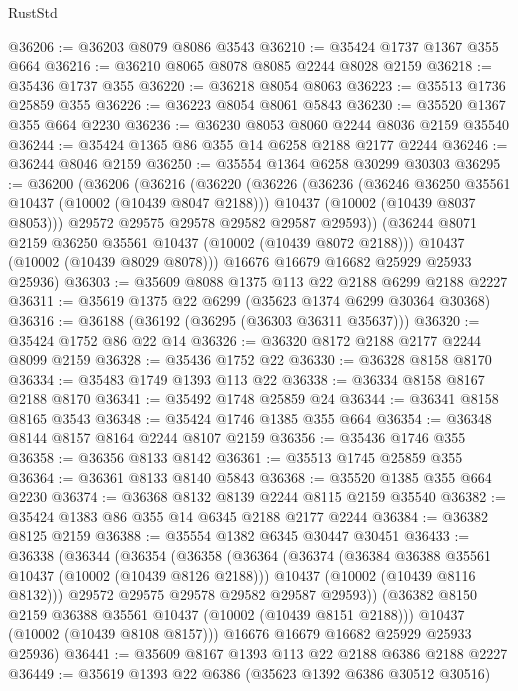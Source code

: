 \begin{lexlean}{RustStd}
\begin{coremodule}
@36206 := @36203 @8079 @8086 @3543
@36210 := @35424 @1737 @1367 @355 @664
@36216 := @36210 @8065 @8078 @8085 @2244 @8028 @2159
@36218 := @35436 @1737 @355
@36220 := @36218 @8054 @8063
@36223 := @35513 @1736 @25859 @355
@36226 := @36223 @8054 @8061 @5843
@36230 := @35520 @1367 @355 @664 @2230
@36236 := @36230 @8053 @8060 @2244 @8036 @2159 @35540
@36244 := @35424 @1365 @86 @355 @14 @6258 @2188 @2177 @2244
@36246 := @36244 @8046 @2159
@36250 := @35554 @1364 @6258 @30299 @30303
@36295 := @36200
    (@36206
      (@36216
        (@36220
          (@36226
            (@36236
              (@36246 @36250 @35561 @10437 (@10002 (@10439 @8047 @2188)))
              @10437
              (@10002 (@10439 @8037 @8053)))
            @29572
            @29575
            @29578
            @29582
            @29587
            @29593))
        (@36244 @8071 @2159 @36250 @35561 @10437 (@10002 (@10439 @8072 @2188)))
        @10437
        (@10002 (@10439 @8029 @8078)))
      @16676
      @16679
      @16682
      @25929
      @25933
      @25936)
@36303 := @35609 @8088 @1375 @113 @22 @2188 @6299 @2188 @2227
@36311 := @35619 @1375 @22 @6299 (@35623 @1374 @6299 @30364 @30368)
@36316 := @36188 (@36192 (@36295 (@36303 @36311 @35637)))
@36320 := @35424 @1752 @86 @22 @14
@36326 := @36320 @8172 @2188 @2177 @2244 @8099 @2159
@36328 := @35436 @1752 @22
@36330 := @36328 @8158 @8170
@36334 := @35483 @1749 @1393 @113 @22
@36338 := @36334 @8158 @8167 @2188 @8170
@36341 := @35492 @1748 @25859 @24
@36344 := @36341 @8158 @8165 @3543
@36348 := @35424 @1746 @1385 @355 @664
@36354 := @36348 @8144 @8157 @8164 @2244 @8107 @2159
@36356 := @35436 @1746 @355
@36358 := @36356 @8133 @8142
@36361 := @35513 @1745 @25859 @355
@36364 := @36361 @8133 @8140 @5843
@36368 := @35520 @1385 @355 @664 @2230
@36374 := @36368 @8132 @8139 @2244 @8115 @2159 @35540
@36382 := @35424 @1383 @86 @355 @14 @6345 @2188 @2177 @2244
@36384 := @36382 @8125 @2159
@36388 := @35554 @1382 @6345 @30447 @30451
@36433 := @36338
    (@36344
      (@36354
        (@36358
          (@36364
            (@36374
              (@36384 @36388 @35561 @10437 (@10002 (@10439 @8126 @2188)))
              @10437
              (@10002 (@10439 @8116 @8132)))
            @29572
            @29575
            @29578
            @29582
            @29587
            @29593))
        (@36382 @8150 @2159 @36388 @35561 @10437 (@10002 (@10439 @8151 @2188)))
        @10437
        (@10002 (@10439 @8108 @8157)))
      @16676
      @16679
      @16682
      @25929
      @25933
      @25936)
@36441 := @35609 @8167 @1393 @113 @22 @2188 @6386 @2188 @2227
@36449 := @35619 @1393 @22 @6386 (@35623 @1392 @6386 @30512 @30516)

\end{coremodule}
\end{lexlean}
